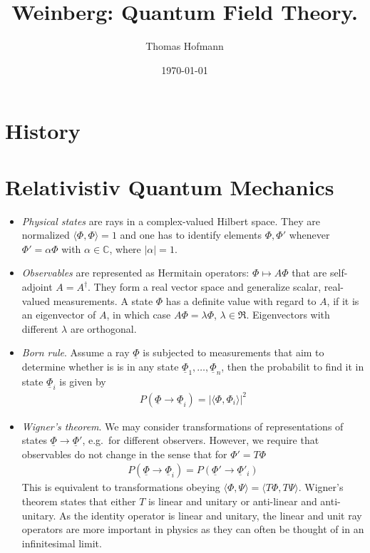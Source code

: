 \documentclass[12pt,a4paper]{article}
\author{Thomas Hofmann}
\title{Weinberg: Quantum Field Theory.}
\date{\today}
\newcommand{\rPhi}{{\underline{\Phi}}}
\begin{document}
\maketitle

\section{History}

\section{Relativistiv Quantum Mechanics}

\begin{itemize}
\item \textit{Physical states} are rays in a complex-valued Hilbert space. They are normalized $\langle \Phi, \Phi \rangle = 1$ and one has to identify elements $\Phi, \Phi'$ whenever $\Phi' = \alpha \Phi$ with $\alpha \in \mathbb  C$, where $|\alpha|=1$.
\item \textit{Observables} are represented as Hermitain operators: $\Phi \mapsto A \Phi$ that are self-adjoint $A = A^\dagger$. They form a real vector space and generalize scalar, real-valued measurements. A state $\Phi$ has a definite value with regard to $A$, if it is an eigenvector of $A$, in which case $A\Phi= \lambda \Phi$, $\lambda \in \Re$.   Eigenvectors with different $\lambda$ are orthogonal. 
\item  \textit{Born rule}. Assume a ray $\rPhi$ is subjected to measurements that aim to determine whether is is in any state $\rPhi_1,\dots,\rPhi_n$, then the probabilit to find it in state $\rPhi_i$ is given by 
\begin{align}
P(\rPhi \to \rPhi_i) =  |\langle \Phi, \Phi_i \rangle|^2 
\end{align}
\item \textit{Wigner's theorem}. We may consider transformations of representations of states $\rPhi \to \rPhi'$, e.g.~for different observers. However, we require that observables do not change in the sense that for $\Phi' = T \Phi$ 
\begin{align}
P(\rPhi \to \rPhi_i) = P(\rPhi' \to \rPhi'_i)
\end{align}
This is equivalent to transformations obeying $\langle \Phi, \Psi \rangle = \langle T \Phi, T \Psi \rangle$. Wigner's theorem states that either $T$ is linear and unitary or anti-linear and anti-unitary. As the identity operator is linear and unitary, the linear and unit ray operators are more important in physics as they can often be thought of in an infinitesimal limit.

\end{itemize}
\end{document}
